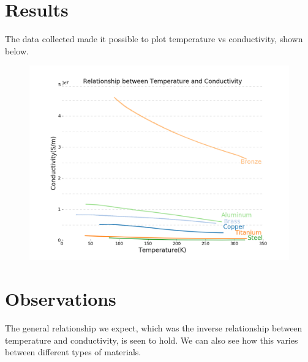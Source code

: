 \documentclass{article}
\begin{document}
\section{Results}

The data collected made it possible to plot temperature vs conductivity, shown below.

\begin{figure}[h!]
\centering
\includegraphics[scale=0.4]{lab1b.png}
\end{figure}

\section{Observations}

The general relationship we expect, which was the inverse relationship between temperature and conductivity, is seen to hold. We can also see how this varies between different types of materials.
\end{document}
